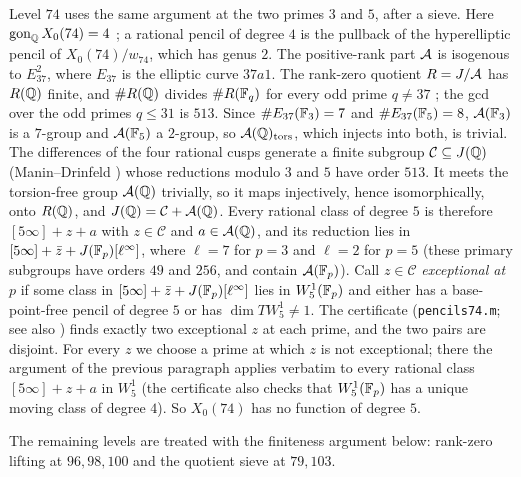 Level $74$ uses the same argument at the two primes $3$ and $5$, after a sieve. Here $\operatorname{gon}_{\mathbb{Q}} X_0(74)=4$
\cite[Theorem~1.2]{NajmanOrlic2024}; a rational pencil of degree $4$ is the pullback of the hyperelliptic pencil of
$X_0(74)/w_{74}$, which has genus $2$. The positive-rank part $\mathcal{A}$ is isogenous to $E_{37}^2$, where $E_{37}$ is
the elliptic curve $37a1$. The rank-zero quotient $R=J/\mathcal{A}$ has $R(\mathbb{Q})$ finite, and $\#R(\mathbb{Q})$ divides $\#R(\mathbb{F}_q)$ for
every odd prime $q\ne37$ \cite[Appendix]{Katz1981}; the gcd over the odd primes $q\le31$ is $513$. Since
$\#E_{37}(\mathbb{F}_3)=7$ and $\#E_{37}(\mathbb{F}_5)=8$, $\mathcal{A}(\mathbb{F}_3)$ is a $7$-group and $\mathcal{A}(\mathbb{F}_5)$ a $2$-group, so
$\mathcal{A}(\mathbb{Q})_{\mathrm{tors}}$, which injects into both, is trivial. The differences of the four rational cusps generate a
finite subgroup $\mathcal C\subseteq J(\mathbb{Q})$ (Manin--Drinfeld \cite{Manin1972,Drinfeld1973}) whose reductions modulo
$3$ and $5$ have order $513$. It meets the torsion-free group $\mathcal{A}(\mathbb{Q})$ trivially, so it maps injectively, hence
isomorphically, onto $R(\mathbb{Q})$, and $J(\mathbb{Q})=\mathcal C+\mathcal{A}(\mathbb{Q})$. Every rational class of degree $5$ is therefore
$[5\infty]+z+a$ with $z\in\mathcal C$ and $a\in\mathcal{A}(\mathbb{Q})$, and its reduction lies in $[5\infty]+\bar z+J(\mathbb{F}_p)[\ell^\infty]$,
where $\ell=7$ for $p=3$ and $\ell=2$ for $p=5$ (these primary subgroups have orders $49$ and $256$, and contain
$\mathcal{A}(\mathbb{F}_p)$). Call $z\in\mathcal C$ \emph{exceptional at $p$} if some class in $[5\infty]+\bar z+J(\mathbb{F}_p)[\ell^\infty]$
lies in $W^1_5(\mathbb{F}_p)$ and either has a base-point-free pencil of degree $5$ or has $\dim T W^1_5\ne1$. The certificate
(\texttt{pencils74.m}; see also \cite{SuppA}) finds exactly two exceptional $z$ at each prime, and the two pairs are disjoint. For every $z$ we choose a prime at
which $z$ is not exceptional; there the argument of the previous paragraph applies verbatim to every rational class
$[5\infty]+z+a$ in $W^1_5$ (the certificate also checks that $W^1_5(\mathbb{F}_p)$ has a unique moving class of degree $4$).
So $X_0(74)$ has no function of degree $5$.

The remaining levels are treated with the finiteness argument below: rank-zero lifting at $96,98,100$ and the
quotient sieve at $79,103$.

